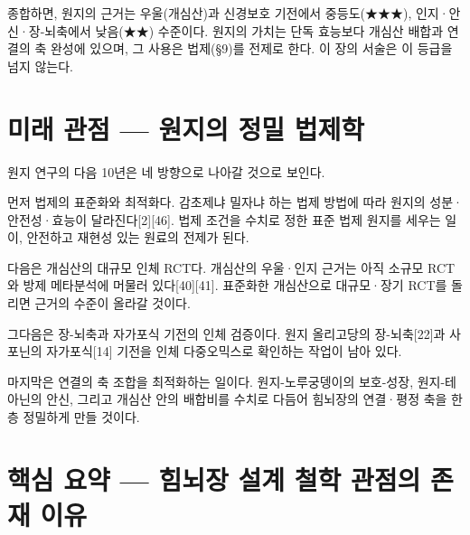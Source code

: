 \documentclass[12pt,oneside]{book}
\begin{document}
\vspace{2pt}\vspace{3pt}

종합하면, 원지의 근거는 우울(개심산)과 신경보호 기전에서 중등도(★★★), 인지·안신·장-뇌축에서 낮음(★★) 수준이다. 원지의 가치는 단독 효능보다 개심산 배합과 연결의 축 완성에 있으며, 그 사용은 법제(§9)를 전제로 한다. 이 장의 서술은 이 등급을 넘지 않는다.

\section{미래 관점 — 원지의 정밀 법제학}

원지 연구의 다음 10년은 네 방향으로 나아갈 것으로 보인다.

먼저 법제의 표준화와 최적화다. 감초제냐 밀자냐 하는 법제 방법에 따라 원지의 성분·안전성·효능이 달라진다[2][46]. 법제 조건을 수치로 정한 표준 법제 원지를 세우는 일이, 안전하고 재현성 있는 원료의 전제가 된다.

다음은 개심산의 대규모 인체 RCT다. 개심산의 우울·인지 근거는 아직 소규모 RCT와 방제 메타분석에 머물러 있다[40][41]. 표준화한 개심산으로 대규모·장기 RCT를 돌리면 근거의 수준이 올라갈 것이다.

그다음은 장-뇌축과 자가포식 기전의 인체 검증이다. 원지 올리고당의 장-뇌축[22]과 사포닌의 자가포식[14] 기전을 인체 다중오믹스로 확인하는 작업이 남아 있다.

마지막은 연결의 축 조합을 최적화하는 일이다. 원지-노루궁뎅이의 보호-성장, 원지-테아닌의 안신, 그리고 개심산 안의 배합비를 수치로 다듬어 힘뇌장의 연결·평정 축을 한층 정밀하게 만들 것이다.

\section{핵심 요약 — 힘뇌장 설계 철학 관점의 존재 이유}
\end{document}
